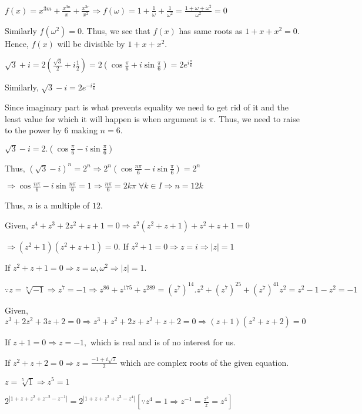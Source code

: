   $f(x) = x^{3m} + \frac{x^{3n}}{x} + \frac{x^{3r}}{x^2} \Rightarrow f(\omega) = 1 + \frac{1}{\omega} +
  \frac{1}{\omega^2} = \frac{1 + \omega + \omega^2}{\omega^2} = 0$

  Similarly $f(\omega^2) = 0$. Thus, we see that $f(x)$ has same roots as $1 + x + x^2= 0.$ Hence, $f(x)$
  will be divisible by $1 + x + x^2$.
\item $\sqrt{3} + i = 2\left(\frac{\sqrt{3}}{2} + i\frac{1}{2}\right) = 2\left(\cos\frac{\pi}{6} +
  i\sin\frac{\pi}{6}\right) = 2e^{i\frac{\pi}{6}}$

  Similarly, $\sqrt{3} - i = 2e^{-i\frac{\pi}{6}}$

  Since imaginary part is what prevents equality we need to get rid of it and the least value for which it
  will happen is when argument is $\pi.$ Thus, we need to raise to the power by $6$ making $n = 6$.
\item $\sqrt{3} - i = 2.\left(\cos\frac{\pi}{6} - i\sin\frac{\pi}{6}\right)$

  Thus, $(\sqrt{3} - i)^n = 2^n \Rightarrow 2^n\left(\cos\frac{n\pi}{6} - i\sin\frac{\pi}{6}\right) = 2^n$

  $\Rightarrow \cos\frac{n\pi}{6} - i\sin\frac{n\pi}{6} = 1 \Rightarrow \frac{n\pi}{6} = 2k\pi\;\forall k\in
  I \Rightarrow n = 12k$

  Thus, $n$ is a multiple of $12$.
\item Given, $z^4 + z^3 + 2z^2 + z + 1 = 0 \Rightarrow z^2(z^2 + z + 1) + z^2 + z + 1 = 0$

  $\Rightarrow (z^2 + 1)(z^2 + z + 1) = 0$. If $z^2 + 1 = 0 \Rightarrow z = i \Rightarrow |z| = 1$

  If $z^2 + z + 1 = 0 \Rightarrow z = \omega, \omega^2 \Rightarrow |z| = 1$.
\item $\because z = \sqrt[7]{-1}\Rightarrow z^7 = -1\Rightarrow z^{86} + z^{175} + z^{289} = (z^7)^{14}.z^2
  + (z^7)^{25} + (z^7)^{41}z^2 = z^2 -1 -z^2 = -1$
\item Given, $z^3 + 2z^2 + 3z + 2 = 0\Rightarrow z^3 + z^2 + 2z + z^2 + z + 2 = 0\Rightarrow (z + 1)(z^2 + z
  + 2) = 0$

  If $z + 1 = 0 \Rightarrow z = -1,$ which is real and is of no interest for us.

  If $z^2 + z + 2 = 0 \Rightarrow z = \frac{-1 + i\sqrt{7}}{2}$ which are complex roots of the given
  equation.
\item $z = \sqrt[5]{1} \Rightarrow z^5 = 1$

  $2^{|1 + z + z^2 + z^{-2} - z^{-1}|} = 2^{|1 + z + z^2 + z^3 - z^4|}[\because z^4 = 1 \Rightarrow z^{-1} =
  \frac{z^5}{z} = z^4]$

